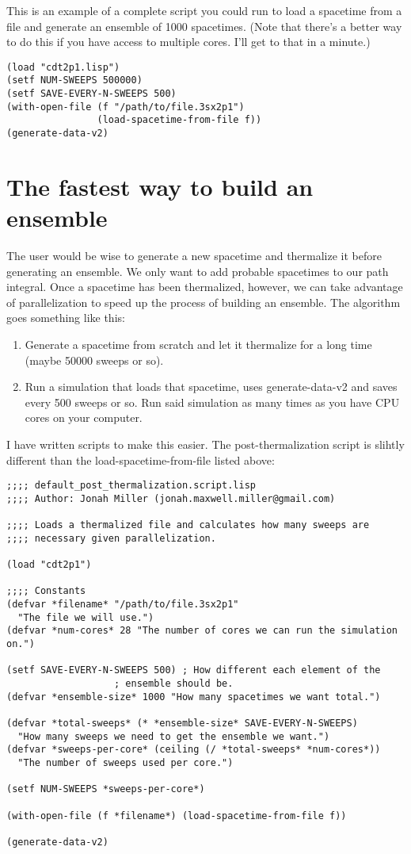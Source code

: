 \documentclass{article}
\begin{document}
This is an example of a complete script you could run to load a
spacetime from a file and generate an ensemble of 1000
spacetimes. (Note that there's a better way to do this if you have
access to multiple cores. I'll get to that in a minute.)
\begin{lstlisting}
(load "cdt2p1.lisp")
(setf NUM-SWEEPS 500000)
(setf SAVE-EVERY-N-SWEEPS 500)
(with-open-file (f "/path/to/file.3sx2p1")
                (load-spacetime-from-file f))
(generate-data-v2)
\end{lstlisting}


\section{The fastest way to build an ensemble}
The user would be wise to generate a new spacetime and thermalize it
before generating an ensemble. We only want to add probable spacetimes
to our path integral. Once a spacetime has been thermalized, however,
we can take advantage of parallelization to speed up the process of
building an ensemble. The algorithm goes something like this:
\begin{enumerate}
\item Generate a spacetime from scratch and let it thermalize for a
  long time (maybe 50000 sweeps or so).
\item Run a simulation that loads that spacetime, uses
  generate-data-v2 and saves every 500 sweeps or so. Run said
  simulation as many times as you have CPU cores on your computer.
\end{enumerate}
I have written scripts to make this easier. The post-thermalization script is slihtly different than the load-spacetime-from-file listed above:
\begin{lstlisting}
;;;; default_post_thermalization.script.lisp
;;;; Author: Jonah Miller (jonah.maxwell.miller@gmail.com)

;;;; Loads a thermalized file and calculates how many sweeps are
;;;; necessary given parallelization.

(load "cdt2p1")

;;;; Constants
(defvar *filename* "/path/to/file.3sx2p1"
  "The file we will use.")
(defvar *num-cores* 28 "The number of cores we can run the simulation on.")

(setf SAVE-EVERY-N-SWEEPS 500) ; How different each element of the
			       ; ensemble should be.
(defvar *ensemble-size* 1000 "How many spacetimes we want total.")

(defvar *total-sweeps* (* *ensemble-size* SAVE-EVERY-N-SWEEPS) 
  "How many sweeps we need to get the ensemble we want.")
(defvar *sweeps-per-core* (ceiling (/ *total-sweeps* *num-cores*))
  "The number of sweeps used per core.")

(setf NUM-SWEEPS *sweeps-per-core*)

(with-open-file (f *filename*) (load-spacetime-from-file f))

(generate-data-v2)
\end{lstlisting}
\end{document}
